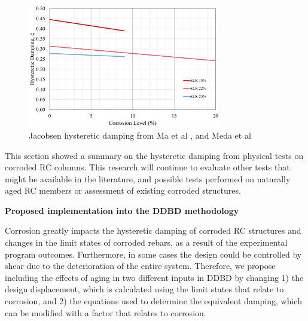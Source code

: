 \begin{figure}[htbp]
	\centering
    \includegraphics[width=0.75\textwidth]{VAC Prelim 2.0/Chapter-5/figs/HystereticDampingLitResults.png}
	\caption{Jacobsen hysteretic damping from Ma et al \cite{Ma2012}, and Meda et al \cite{Meda2014}}
	\label{fig:JacobsenResults}
\end{figure}

This section showed a summary on the hysteretic damping from physical tests on corroded RC columns. This research will continue to evaluate other tests that might be available in the literature, and possible tests performed on naturally aged RC members or assessment of existing corroded structures.

\textbf{Proposed implementation into the DDBD methodology}

Corrosion greatly impacts the hysteretic damping of corroded RC structures and changes in the limit states of corroded rebars, as a result of the experimental program outcomes. Furthermore, in some cases the design could be controlled by shear due to the deterioration of the entire system. Therefore, we propose including the effects of aging in two different inputs in DDBD by changing 1) the design displacement, which is calculated using the limit states that relate to corrosion, and 2) the equations used to determine the equivalent damping, which can be modified with a factor that relates to corrosion.
\newpage
